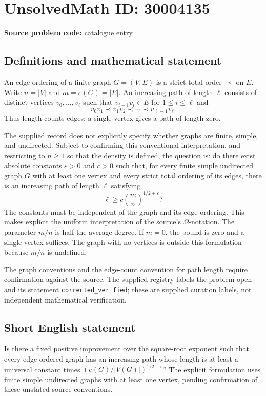 \documentclass[11pt]{article}
\begin{document}
\section*{UnsolvedMath ID: 30004135}
\textbf{Source problem code:} catalogue entry
\subsection{Definitions and mathematical statement}
An edge ordering of a finite graph \(G=(V,E)\) is a strict total order \(\prec\) on \(E\). Write \(n=|V|\) and \(m=e(G)=|E|\). An increasing path of length \(\ell\) consists of distinct vertices \(v_0,\ldots,v_\ell\) such that \(v_{i-1}v_i\in E\) for \(1\le i\le\ell\) and
\[
 v_0v_1\prec v_1v_2\prec\cdots\prec v_{\ell-1}v_\ell.
\]
Thus length counts edges; a single vertex gives a path of length zero.

The supplied record does not explicitly specify whether graphs are finite, simple, and undirected. Subject to confirming this conventional interpretation, and restricting to \(n\ge1\) so that the density is defined, the question is: do there exist absolute constants \(\varepsilon>0\) and \(c>0\) such that, for every finite simple undirected graph \(G\) with at least one vertex and every strict total ordering of its edges, there is an increasing path of length \(\ell\) satisfying
\[
 \ell\ge c\left(\frac{m}{n}\right)^{1/2+\varepsilon}?
\]
The constants must be independent of the graph and its edge ordering. This makes explicit the uniform interpretation of the source's \(\Omega\)-notation. The parameter \(m/n\) is half the average degree. If \(m=0\), the bound is zero and a single vertex suffices. The graph with no vertices is outside this formulation because \(m/n\) is undefined.

The graph conventions and the edge-count convention for path length require confirmation against the source. The supplied registry labels the problem open and its statement \texttt{corrected\_verified}; these are supplied curation labels, not independent mathematical verification.
\subsection{Short English statement}
Is there a fixed positive improvement over the square-root exponent such that every edge-ordered graph has an increasing path whose length is at least a universal constant times \((e(G)/|V(G)|)^{1/2+\varepsilon}\)? The explicit formulation uses finite simple undirected graphs with at least one vertex, pending confirmation of these unstated source conventions.
\end{document}
